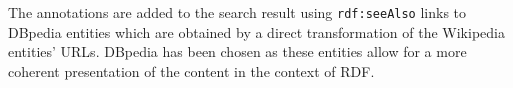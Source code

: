 \documentclass{llncs}
\begin{document}
\begin{itemize}
\end{itemize}

The annotations are added to the search result using \texttt{rdf:seeAlso} links to DBpedia entities \cite{key:dbpedia} which are obtained by a direct transformation of the Wikipedia entities' URLs. DBpedia has been chosen as these entities allow for a more coherent presentation of the content in the context of RDF.

\end{document}
